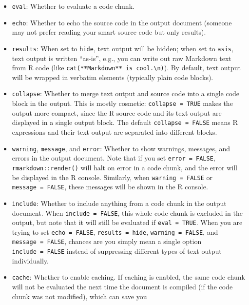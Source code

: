 \documentclass[]{article}
\begin{document}
\begin{itemize}
\item
  \texttt{eval}: Whether to evaluate a code chunk.
\item
  \texttt{echo}: Whether to echo the source code in the output document
  (someone may not prefer reading your smart source code but only
  results).
\item
  \texttt{results}: When set to
  \texttt{\textquotesingle{}hide\textquotesingle{}}, text output will be
  hidden; when set to \texttt{\textquotesingle{}asis\textquotesingle{}},
  text output is written ``as-is'', e.g., you can write out raw Markdown
  text from R code (like
  \texttt{cat(\textquotesingle{}**Markdown**\ is\ cool.\textbackslash{}n\textquotesingle{})}).
  By default, text output will be wrapped in verbatim elements
  (typically plain code blocks).
\item
  \texttt{collapse}: Whether to merge text output and source code into a
  single code block in the output. This is mostly cosmetic:
  \texttt{collapse\ =\ TRUE} makes the output more compact, since the R
  source code and its text output are displayed in a single output
  block. The default \texttt{collapse\ =\ FALSE} means R expressions and
  their text output are separated into different blocks.
\item
  \texttt{warning}, \texttt{message}, and \texttt{error}: Whether to
  show warnings, messages, and errors in the output document. Note that
  if you set \texttt{error\ =\ FALSE}, \texttt{rmarkdown::render()} will
  halt on error in a code chunk, and the error will be displayed in the
  R console. Similarly, when \texttt{warning\ =\ FALSE} or
  \texttt{message\ =\ FALSE}, these messages will be shown in the R
  console.
\item
  \texttt{include}: Whether to include anything from a code chunk in the
  output document. When \texttt{include\ =\ FALSE}, this whole code
  chunk is excluded in the output, but note that it will still be
  evaluated if \texttt{eval\ =\ TRUE}. When you are trying to set
  \texttt{echo\ =\ FALSE},
  \texttt{results\ =\ \textquotesingle{}hide\textquotesingle{}},
  \texttt{warning\ =\ FALSE}, and \texttt{message\ =\ FALSE}, chances
  are you simply mean a single option \texttt{include\ =\ FALSE} instead
  of suppressing different types of text output individually.
\item
  \texttt{cache}: Whether to enable caching. If caching is enabled, the
  same code chunk will not be evaluated the next time the document is
  compiled (if the code chunk was not modified), which can save you

\end{itemize}
\end{document}
